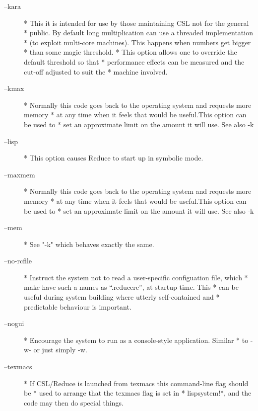 \documentclass[a4paper,11pt]{article}
\begin{document}
\begin{description}
\item [{\ttfamily --kara}] 
          * This it is intended for use by those maintaining CSL not for the general
          * public. By default long multiplication can use a threaded implementation
          * (to exploit multi-core machines). This happens when numbers get bigger
          * than some magic threshold.
          * This option allows one to override the default threshold so that
          * performance effects can be measured and the cut-off adjusted to suit the
          * machine involved.

\item [{\ttfamily --kmax}] 
          * Normally this code goes back to the operating system and requests more memory
          * at any time when it feels that would be useful.This option can be used to
          * set an approximate limit on the amount it will use. See also -k

\item [{\ttfamily --lisp}] 
          * This option causes Reduce to start up in symbolic mode.

\item [{\ttfamily --maxmem}] 
          * Normally this code goes back to the operating system and requests more memory
          * at any time when it feels that would be useful.This option can be used to
          * set an approximate limit on the amount it will use. See also -k

\item [{\ttfamily --mem}] 
          * See "-k" which behaves exactly the same.

\item [{\ttfamily --no-rcfile}] 
          * Instruct the system not to read a user-specific configuation file, which
          * make have such a names as ``{\ttfamily .reducerc}'', at startup time. This
          * can be useful during system building where utterly self-contained and
          * predictable behaviour is important.

\item [{\ttfamily --nogui}] 
          * Encourage the system to run as a console-style application. Similar
          * to {\ttfamily -w-} or just simply {\ttfamily -w}.

\item [{\ttfamily --texmacs}] 
          * If CSL/Reduce is launched from texmacs this command-line flag should be
          * used to arrange that the {\ttfamily texmacs} flag is set in
          * {\ttfamily lispsystem!*}, and the code may then do special things.


\end{description}
\end{document}
